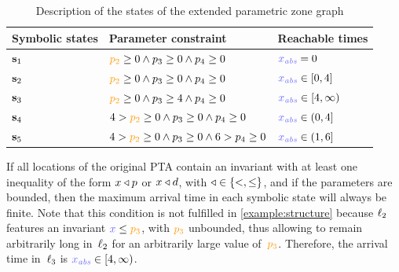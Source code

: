\begin{tikzborder}{\cite{Gargantini16:validation}}
\begin{tikzborder}{\cite{gargantini_combinatorial_2017}}
\begin{tikzborder}{\cite{gargantini_combinatorial_2017}}
\begin{tikzborder}{\cite{garn2019}}
\begin{tikzborder}{\cite{arcaini2019achieving}}
\begin{tikzborder}{\cite{arcaini2019varivolution}}
\begin{tikzborder}{}
\begin{example}
\begin{figure}[tb]
	\end{figure}
	
	\begin{table}[!htb]
		\caption{Description of the states of the extended parametric zone graph}
		\centering
		\begin{tabular}{l | l | l}
			\hline
			\rowHeader{} Symbolic states & Parameter constraint & Reachable times \\
			\hline
			$\mathbf{s}_1$ & $\parami{2} \geq 0 \land \param_3 \geq 0 \land \param_4 \geq 0 $ & $\clockabs = 0$ \\
			\hline
			$\mathbf{s}_2$ & $\parami{2} \geq 0 \land \param_3 \geq 0 \land \param_4 \geq 0 $ & $\clockabs \in [0, 4]$ \\
			\hline
			$\mathbf{s}_3$ & $\parami{2} \geq 0 \land \param_3 \geq 4 \land \param_4 \geq 0 $ & $\clockabs \in [4, \infty)$ \\
			\hline
			$\mathbf{s}_4$ & $4 > \parami{2} \geq 0 \land \param_3 \geq 0 \land \param_4 \geq 0 $ & $\clockabs \in (0, 4]$ \\
			\hline
			$\mathbf{s}_5$ & $4 > \parami{2} \geq 0 \land \param_3 \geq 0 \land 6 > \param_4 \geq 0 $ & $\clockabs \in (1, 6]$ \\
			\hline
		\end{tabular}
		\label{table:extended-PZG}
		
	\end{table}
\end{example}


\begin{remark}
	If all locations of the original PTA contain an invariant with at least one inequality of the form $x \triangleleft p$ or $x \triangleleft d$, with $\triangleleft \in \{ <, \leq \}$, and if the parameters are bounded, then the maximum arrival time in each symbolic state will always be finite.
	Note that this condition is not fulfilled in \ref{example:structure} because $\ell_2$ features an invariant $\styleclock{x} \leq \parami{3}$, with $\parami{3}$ unbounded, thus allowing to remain arbitrarily long in~$\ell_2$ for an arbitrarily large value of~$\parami{3}$.
	Therefore, the arrival time in~$\ell_3$ is $\clockabs \in [4, \infty)$.
\end{remark}

\end{tikzborder}


\end{tikzborder}
\end{tikzborder}
\end{tikzborder}
\end{tikzborder}
\end{tikzborder}
\end{tikzborder}

